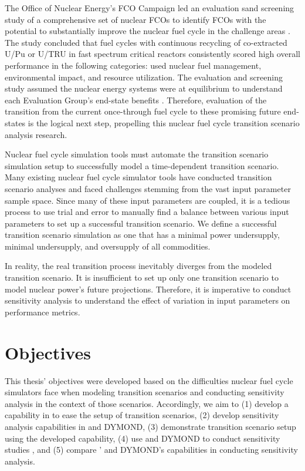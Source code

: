 The Office of Nuclear Energy's
\gls{FCO} Campaign led an evaluation 
sand screening study of a comprehensive set of nuclear \glspl{FCO} 
to identify \glspl{FCO} with the potential to substantially 
improve the nuclear fuel cycle in the challenge areas
\cite{wigeland_nuclear_2014}. 
The study concluded that fuel cycles with continuous recycling
of co-extracted U/Pu or U/TRU in fast spectrum critical reactors
consistently scored high overall performance in the following 
categories: used nuclear fuel management, environmental impact, 
and resource utilization. 
The evaluation and screening study assumed
the nuclear energy systems were at equilibrium to understand 
each Evaluation Group's
end-state benefits \cite{feng_standardized_2016}. 
Therefore, evaluation of the transition from the current 
once-through fuel cycle to these promising 
future end-states \cite{feng_standardized_2016} 
is the logical next step, propelling this
nuclear fuel cycle transition scenario analysis research. 

Nuclear fuel cycle simulation tools must automate the transition scenario simulation 
setup to successfully model a time-dependent transition scenario. 
Many existing nuclear fuel cycle simulator tools have conducted 
transition scenario analyses 
\cite{feng_standardized_2016,bae_standardized_2019,coquelet-pascal_cosi6:_2015}
and faced challenges stemming from the vast input parameter
sample space.
Since many of these input parameters are coupled, it is 
a tedious process to use trial and error to manually find a balance 
between various input parameters to set up a successful transition 
scenario. 
We define a successful transition scenario simulation as one that 
has a minimal power undersupply, minimal undersupply, 
and oversupply of all commodities. 
 
In reality, the real transition process inevitably diverges
from the modeled transition scenario. 
It is insufficient to set up only one transition scenario to model 
nuclear power's future projections.
Therefore, it is imperative to conduct sensitivity analysis to understand 
the effect of variation in input parameters on 
performance metrics. 

\section{Objectives}
This thesis' objectives were developed based on the difficulties 
nuclear fuel cycle simulators face when modeling transition scenarios 
and conducting sensitivity analysis in the context of those scenarios.
Accordingly, we aim to 
(1) develop a capability in \Cyclus to ease the setup of 
transition scenarios, 
(2) develop sensitivity analysis capabilities in \Cyclus and DYMOND, 
(3) demonstrate \Cyclus transition scenario setup using the 
developed capability,
(4) use \Cyclus and DYMOND to conduct sensitivity studies
, and
(5) compare \Cyclus' and DYMOND's capabilities in conducting sensitivity 
analysis. 
